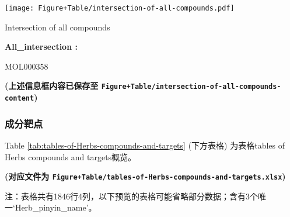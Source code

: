 \documentclass[
]{article}
\begin{document}
\def\@captype{figure}
\begin{center}
\texttt{[image: Figure+Table/intersection-of-all-compounds.pdf]}
\caption{Intersection of all compounds}\label{fig:intersection-of-all-compounds}
\end{center}
\begin{center}\begin{tcolorbox}[colback=gray!10, colframe=gray!50, width=0.9\linewidth, arc=1mm, boxrule=0.5pt]
\textbf{
All\_intersection
:}

\vspace{0.5em}

    MOL000358

\vspace{2em}
\end{tcolorbox}
\end{center}

\textbf{(上述信息框内容已保存至 \texttt{Figure+Table/intersection-of-all-compounds-content})}

\hypertarget{ux6210ux5206ux9776ux70b9}{%
\subsubsection{成分靶点}\label{ux6210ux5206ux9776ux70b9}}

Table \ref{tab:tables-of-Herbs-compounds-and-targets} (下方表格) 为表格tables of Herbs compounds and targets概览。

\textbf{(对应文件为 \texttt{Figure+Table/tables-of-Herbs-compounds-and-targets.xlsx})}

\begin{center}\begin{tcolorbox}[colback=gray!10, colframe=gray!50, width=0.9\linewidth, arc=1mm, boxrule=0.5pt]注：表格共有1846行4列，以下预览的表格可能省略部分数据；含有3个唯一`Herb\_pinyin\_name'。
\end{tcolorbox}
\end{center}
\end{document}
